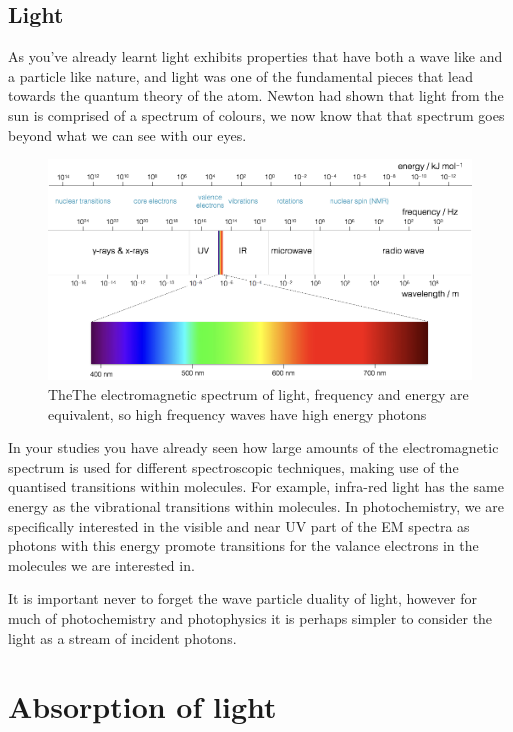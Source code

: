 \documentclass[
]{book}
\begin{document}
\hypertarget{sec:Light}{%
\section{Light}\label{sec:Light}}

As you've already learnt light exhibits properties that have both a wave like and a particle like nature, and light was one of the fundamental pieces that lead towards the quantum theory of the atom. Newton had shown that light from the sun is comprised of a spectrum of colours, we now know that that spectrum goes beyond what we can see with our eyes.

\begin{figure}
\includegraphics[width=1\linewidth]{images/EMspectrumspectroscopy} \caption{TheThe electromagnetic spectrum of light, frequency and energy are equivalent, so high frequency waves have high energy photons}\label{fig:EMspect}
\end{figure}

In your studies you have already seen how large amounts of the electromagnetic spectrum is used for different spectroscopic techniques, making use of the quantised transitions within molecules. For example, infra-red light has the same energy as the vibrational transitions within molecules. In photochemistry, we are specifically interested in the visible and near UV part of the EM spectra as photons with this energy promote transitions for the valance electrons in the molecules we are interested in.

It is important never to forget the wave particle duality of light, however for much of photochemistry and photophysics it is perhaps simpler to consider the light as a stream of incident photons.

\hypertarget{ch:Abs}{%
\chapter{Absorption of light}\label{ch:Abs}}
\end{document}
